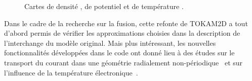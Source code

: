 \begin{refsection}
 \begin{figure}[!htbp]
    \centering
    \caption{Cartes de densité , de potentiel
     et de température
    .}
    \label{2-MagColumnWithTe}
	\end{figure}

Dans le cadre de la recherche sur la fusion, cette refonte de TOKAM2D a tout
d'abord permis de vérifier les approximations choisies dans la description de
l'interchange du modèle original. Mais plus intéressant, les nouvelles
fonctionnalités développées dans le code ont donné lieu à des études sur
le transport du courant dans une géométrie radialement
non-périodique~\parencite{Futtersack} et sur l'influence de la température
électronique~\parencite{Moulton}.


\end{refsection}
